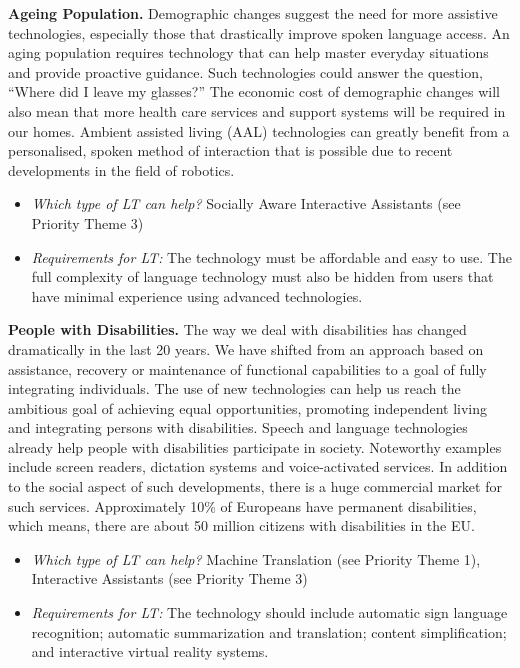 \begin{multicols}{2}
\textbf{Ageing Population.} Demographic changes suggest the need for more assistive technologies, especially those that drastically improve spoken language access. An aging population requires technology that can help master everyday situations and provide proactive guidance. Such technologies could answer the question, “Where did I leave my glasses?” The economic cost of demographic changes will also mean that more health care services and support systems will be required in our homes. Ambient assisted living (AAL) technologies can greatly benefit from a personalised, spoken method of interaction that is possible due to recent developments in the field of robotics. 

\begin{itemize}
\item \emph{Which type of LT can help?} Socially Aware Interactive Assistants (see Priority Theme 3)
\item \emph{Requirements for LT:} The technology must be affordable and easy to use. The full complexity of language technology must also be hidden from users that have minimal experience using advanced technologies.
\end{itemize}

\textbf{People with Disabilities.} The way we deal with disabilities has changed dramatically in the last 20 years. We have shifted from an approach based on assistance, recovery or maintenance of functional capabilities to a goal of fully integrating individuals. The use of new technologies can help us reach the ambitious goal of achieving equal opportunities, promoting independent living and integrating persons with disabilities. Speech and language technologies already help people with disabilities participate in society. Noteworthy examples include screen readers, dictation systems and voice-activated services. In addition to the social aspect of such developments, there is a huge commercial market for such services. Approximately 10\% of Europeans have permanent disabilities, which means, there are about 50 million citizens with disabilities in the EU.

\begin{itemize}
\item \emph{Which type of LT can help?} Machine Translation (see Priority Theme 1), Interactive Assistants (see Priority Theme 3)
\item \emph{Requirements for LT:} The technology should include automatic sign language recognition; automatic summarization and translation; content simplification; and interactive virtual reality systems.
\end{itemize}


\end{multicols}
